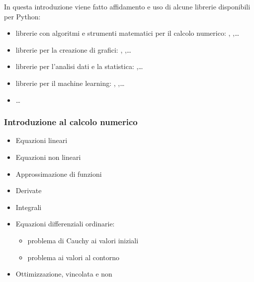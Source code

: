 \documentclass[letterpaper,10pt,italian]{jupyterBook}
\begin{document}
\sphinxAtStartPar
In questa introduzione viene fatto affidamento e uso di alcune librerie disponibili per Python:
\begin{itemize}
\item {} 
\sphinxAtStartPar
librerie con algoritmi e strumenti matematici per il calcolo numerico: , ,…

\item {} 
\sphinxAtStartPar
librerie per la creazione di grafici: , ,…

\item {} 
\sphinxAtStartPar
librerie per l’analisi dati e la statistica: ,…

\item {} 
\sphinxAtStartPar
librerie per il machine learning: , ,…

\item {} 
\sphinxAtStartPar
…

\end{itemize}
\subsubsection*{Introduzione al calcolo numerico}
\begin{itemize}
\item {} 
\sphinxAtStartPar
Equazioni lineari

\item {} 
\sphinxAtStartPar
Equazioni non lineari

\item {} 
\sphinxAtStartPar
Approssimazione di funzioni

\item {} 
\sphinxAtStartPar
Derivate

\item {} 
\sphinxAtStartPar
Integrali

\item {} 
\sphinxAtStartPar
Equazioni differenziali ordinarie:
\begin{itemize}
\item {} 
\sphinxAtStartPar
problema di Cauchy ai valori iniziali

\item {} 
\sphinxAtStartPar
problema ai valori al contorno

\end{itemize}

\item {} 
\sphinxAtStartPar
Ottimizzazione, vincolata e non

\end{itemize}
\end{document}
